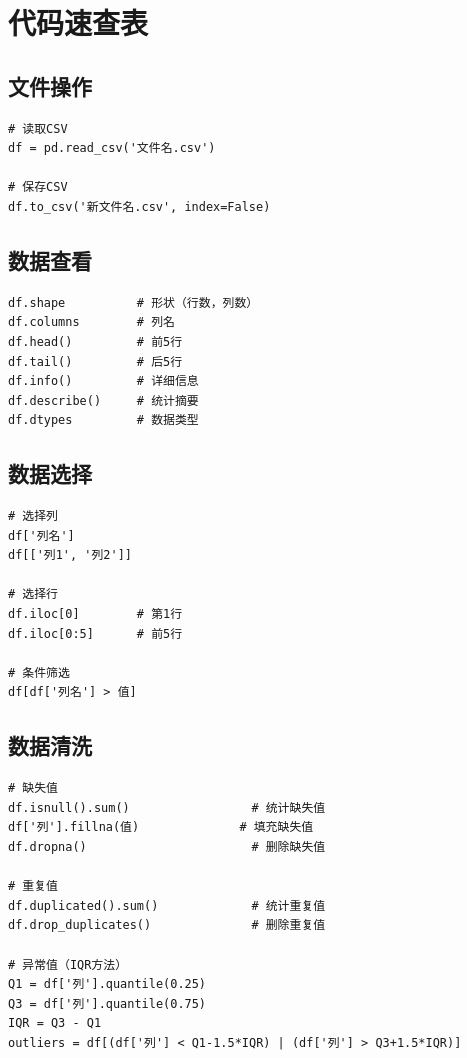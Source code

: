 \documentclass[12pt,a4paper]{article}
\begin{document}
\section{代码速查表}

\subsection{文件操作}

\begin{lstlisting}[caption={读取和保存CSV}]
# 读取CSV
df = pd.read_csv('文件名.csv')

# 保存CSV
df.to_csv('新文件名.csv', index=False)
\end{lstlisting}

\subsection{数据查看}

\begin{lstlisting}[caption={数据查看}]
df.shape          # 形状（行数，列数）
df.columns        # 列名
df.head()         # 前5行
df.tail()         # 后5行
df.info()         # 详细信息
df.describe()     # 统计摘要
df.dtypes         # 数据类型
\end{lstlisting}

\subsection{数据选择}

\begin{lstlisting}[caption={数据选择}]
# 选择列
df['列名']
df[['列1', '列2']]

# 选择行
df.iloc[0]        # 第1行
df.iloc[0:5]      # 前5行

# 条件筛选
df[df['列名'] > 值]
\end{lstlisting}

\subsection{数据清洗}

\begin{lstlisting}[caption={数据清洗}]
# 缺失值
df.isnull().sum()                 # 统计缺失值
df['列'].fillna(值)              # 填充缺失值
df.dropna()                       # 删除缺失值

# 重复值
df.duplicated().sum()             # 统计重复值
df.drop_duplicates()              # 删除重复值

# 异常值（IQR方法）
Q1 = df['列'].quantile(0.25)
Q3 = df['列'].quantile(0.75)
IQR = Q3 - Q1
outliers = df[(df['列'] < Q1-1.5*IQR) | (df['列'] > Q3+1.5*IQR)]
\end{lstlisting}
\end{document}
